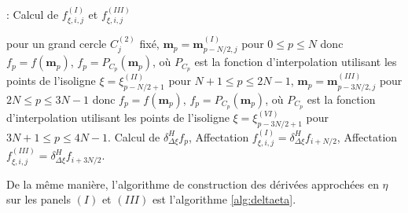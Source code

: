 \begin{center}
\begin{minipage}[H]{12cm}
  \begin{algorithm}[H]
    \caption{: Calcul de $f_{\xi, i, j}^{(I)}$ et $f_{\xi, i, j}^{(III)}$}\label{alg:deltaxi}
    \begin{algorithmic}[1]
    \State pour un grand cercle $C_j^{(2)}$ fixé,
             \State  $\mathbf{m}_p = \mathbf{m}_{p-N/2,j}^{(I)}$ pour $0  \leq p \leq N$ donc $f_p = f(\mathbf{m}_p)$,
             \State $f_p = P_{C_p}(\mathbf{m}_p)$, où $P_{C_p}$ est la fonction d'interpolation utilisant les points de l'isoligne $\xi = \xi^{(II)}_{p-N/2+1}$ pour $N+1 \leq p \leq 2N-1$,
             \State  $\mathbf{m}_p = \mathbf{m}_{p-3N/2,j}^{(III)}$ pour $2N  \leq p \leq 3N-1$ donc $f_p = f(\mathbf{m}_p)$,
             \State $f_p = P_{C_p}(\mathbf{m}_p)$, où $P_{C_p}$ est la fonction d'interpolation utilisant les points de l'isoligne $\xi = \xi^{(VI)}_{p-3N/2+1}$ pour $3N+1 \leq p \leq 4N-1$.
            \EndFor
    \State Calcul de $\delta_{\Delta \xi}^H f_p$,
    \State Affectation $f_{\xi,i,j}^{(I)} = \delta_{\Delta \xi}^H f_{i+N/2}$,
    \State Affectation $f_{\xi,i,j}^{(III)} = \delta_{\Delta \xi}^H f_{i+3N/2}$.
    \EndFor
    \end{algorithmic}
    \end{algorithm}
\end{minipage}
\end{center}
De la même manière, l'algorithme de construction des dérivées approchées en $\eta$ sur les panels $(I)$ et $(III)$ est l'algorithme \ref{alg:deltaeta}.
